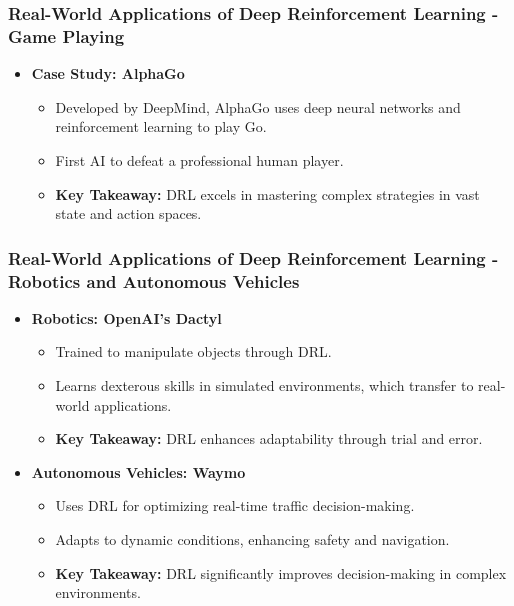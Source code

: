 \documentclass[aspectratio=169]{beamer}
\begin{document}
\begin{frame}[fragile]
    \frametitle{Real-World Applications of Deep Reinforcement Learning - Game Playing}
    \begin{itemize}
        \item \textbf{Case Study: AlphaGo}
            \begin{itemize}
                \item Developed by DeepMind, AlphaGo uses deep neural networks and reinforcement learning to play Go.
                \item First AI to defeat a professional human player.
                \item \textbf{Key Takeaway:} DRL excels in mastering complex strategies in vast state and action spaces.
            \end{itemize}
    \end{itemize}
\end{frame}

\begin{frame}[fragile]
    \frametitle{Real-World Applications of Deep Reinforcement Learning - Robotics and Autonomous Vehicles}
    \begin{itemize}
        \item \textbf{Robotics: OpenAI’s Dactyl}
            \begin{itemize}
                \item Trained to manipulate objects through DRL.
                \item Learns dexterous skills in simulated environments, which transfer to real-world applications.
                \item \textbf{Key Takeaway:} DRL enhances adaptability through trial and error.
            \end{itemize}
            
        \item \textbf{Autonomous Vehicles: Waymo}
            \begin{itemize}
                \item Uses DRL for optimizing real-time traffic decision-making.
                \item Adapts to dynamic conditions, enhancing safety and navigation.
                \item \textbf{Key Takeaway:} DRL significantly improves decision-making in complex environments.
            \end{itemize}
    \end{itemize}
\end{frame}
\end{document}
